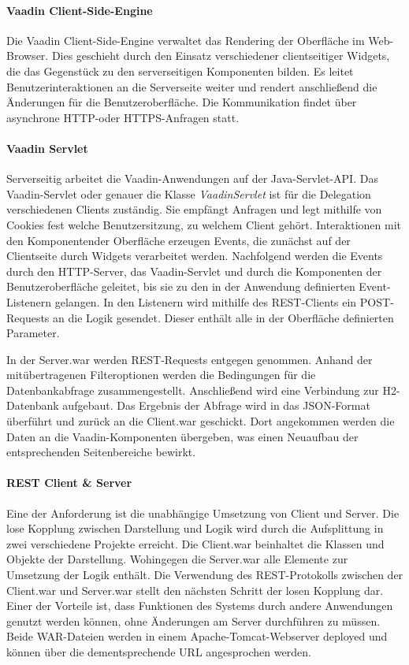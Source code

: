 \paragraph{Vaadin Client-Side-Engine}
Die Vaadin Client-Side-Engine verwaltet das Rendering der Oberfläche im Web-Browser.  Dies geschieht durch den Einsatz verschiedener clientseitiger Widgets, die das Gegenstück zu den serverseitigen Komponenten bilden. Es leitet Benutzerinteraktionen an die Serverseite weiter und rendert anschließend die Änderungen für die Benutzeroberfläche. Die Kommunikation findet über asynchrone HTTP-oder HTTPS-Anfragen statt.

\paragraph{Vaadin Servlet}
Serverseitig arbeitet die Vaadin-Anwendungen auf der Java-Servlet-API. Das Vaadin-Servlet oder genauer die Klasse \textit{VaadinServlet} ist für die Delegation verschiedenen Clients zuständig. Sie empfängt Anfragen und legt mithilfe von Cookies fest welche Benutzersitzung, zu welchem Client gehört.
Interaktionen mit den Komponentender Oberfläche erzeugen Events, die zunächst auf der Clientseite durch Widgets verarbeitet werden. Nachfolgend werden die Events durch den HTTP-Server, das Vaadin-Servlet und durch die Komponenten der Benutzeroberfläche geleitet, bis sie zu den in der Anwendung definierten Event-Listenern gelangen. In den Listenern wird mithilfe des REST-Clients ein POST-Requests an die Logik gesendet. Dieser enthält alle in der Oberfläche definierten Parameter. 

In der Server.war werden REST-Requests entgegen genommen. Anhand der mitübertragenen Filteroptionen werden die Bedingungen für die Datenbankabfrage zusammengestellt. Anschließend wird eine Verbindung zur H2-Datenbank aufgebaut. Das Ergebnis der Abfrage wird in das JSON-Format überführt und zurück an die Client.war geschickt. Dort angekommen werden die Daten an die Vaadin-Komponenten übergeben, was einen Neuaufbau der entsprechenden Seitenbereiche bewirkt.      

\paragraph{REST Client \& Server}
Eine der Anforderung ist die unabhängige Umsetzung von Client und Server. Die lose Kopplung zwischen Darstellung und Logik wird durch die Aufsplittung in zwei verschiedene Projekte erreicht. Die Client.war beinhaltet die Klassen und Objekte der Darstellung. Wohingegen die Server.war alle Elemente zur Umsetzung der Logik enthält. Die Verwendung des REST-Protokolls zwischen der Client.war und Server.war stellt den nächsten Schritt der losen Kopplung dar. Einer der Vorteile ist, dass Funktionen des Systems durch andere Anwendungen genutzt werden können, ohne Änderungen am Server durchführen zu müssen. Beide WAR-Dateien werden in einem Apache-Tomcat-Webserver deployed und können über die dementsprechende URL angesprochen werden.

